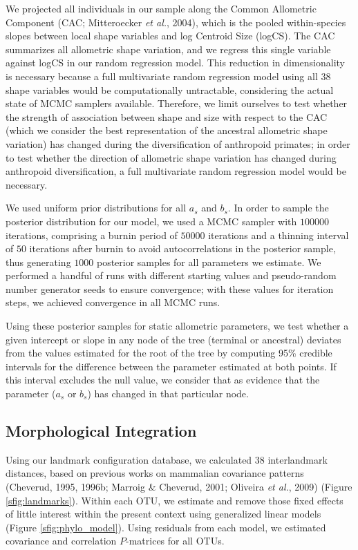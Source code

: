 \documentclass[11pt,twoside]{report}
\begin{document}
We projected all individuals in our sample along the Common Allometric
Component (CAC; Mitteroecker \emph{et al.}, 2004), which is the pooled
within-species slopes between local shape variables and log Centroid
Size (logCS). The CAC summarizes all allometric shape variation, and we
regress this single variable against logCS in our random regression
model. This reduction in dimensionality is necessary because a full
multivariate random regression model using all 38 shape variables would
be computationally untractable, considering the actual state of MCMC
samplers available. Therefore, we limit ourselves to test whether the
strength of association between shape and size with respect to the CAC
(which we consider the best representation of the ancestral allometric
shape variation) has changed during the diversification of anthropoid
primates; in order to test whether the direction of allometric shape
variation has changed during anthropoid diversification, a full
multivariate random regression model would be necessary.

We used uniform prior distributions for all $a_s$ and $b_s$. In order to
sample the posterior distribution for our model, we used a MCMC sampler
with $100000$ iterations, comprising a burnin period of $50000$
iterations and a thinning interval of $50$ iterations after burnin to
avoid autocorrelations in the posterior sample, thus generating $1000$
posterior samples for all parameters we estimate. We performed a handful
of runs with different starting values and pseudo-random number
generator seeds to ensure convergence; with these values for iteration
steps, we achieved convergence in all MCMC runs.

Using these posterior samples for static allometric parameters, we test
whether a given intercept or slope in any node of the tree (terminal or
ancestral) deviates from the values estimated for the root of the tree
by computing 95\% credible intervals for the difference between the
parameter estimated at both points. If this interval excludes the null
value, we consider that as evidence that the parameter ($a_s$ or $b_s$)
has changed in that particular node.

\subsection{Morphological Integration}\label{morphological-integration}

Using our landmark configuration database, we calculated 38
interlandmark distances, based on previous works on mammalian covariance
patterns (Cheverud, 1995, 1996b; Marroig \& Cheverud, 2001; Oliveira
\emph{et al.}, 2009) (Figure \ref{sfig:landmarks}). Within each OTU, we
estimate and remove those fixed effects of little interest within the
present context using generalized linear models (Figure
\ref{sfig:phylo_model}). Using residuals from each model, we estimated
covariance and correlation $P$-matrices for all OTUs.
\end{document}
